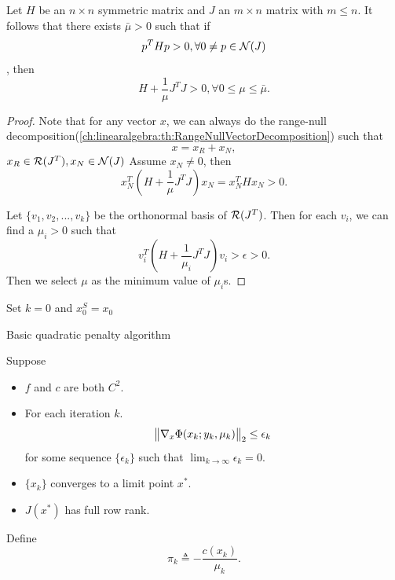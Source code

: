 \begin{refsection}
\begin{lemma}\label{ch:constrained-nonlinear-optimization:th:DebreuLemma}
Let $H$ be an $n\times n$ symmetric matrix and $J$ an $m\times n$ matrix with $m\leq n$. It follows that there exists $\bar{\mu} > 0$ such that if
 $$p^THp > 0, \forall 0\neq p \in \mathcal{N}(J)$$, then $$H+\frac{1}{\mu}J^TJ > 0, \forall 0\leq \mu \leq \bar{\mu}.$$
\end{lemma}
\begin{proof}
Note that for any vector $x$, we can always do the range-null decomposition(\autoref{ch:linearalgebra:th:RangeNullVectorDecomposition}) such that 
$$x = x_R + x_N,$$
$x_R \in \mathcal{R}(J^T), x_N\in \mathcal{N}(J)$
Assume $x_N\neq 0$, then 
$$x_N^T(H + \frac{1}{\mu}J^TJ)x_N = x_N^THx_N > 0.$$

Let $\{v_1,v_2,...,v_k\}$ be the orthonormal basis of $\mathcal{R}(J^T)$. Then for each $v_i$, we can find a $\mu_i > 0$ such that
$$v_i^T(H + \frac{1}{\mu_i}J^TJ)v_i > \epsilon > 0.$$
Then we select $\mu$ as the minimum value of $\mu_i$s.
\end{proof}

\begin{algorithm}[H]
	\SetAlgoLined
	Set $k = 0$ and $x_0^S = x_0$ \\
	\caption{Basic quadratic penalty algorithm}
\end{algorithm}

\begin{lemma}
	Suppose 
	\begin{itemize}
		\item $f$ and $c$ are both $C^2$.
		\item For each iteration $k$.
		$$\norm{\nabla_x \Phi(x_k;y_k,\mu_k)}_2 \leq \epsilon_k$$
		for some sequence $\{\epsilon_k\}$ such that $\lim_{k\to \infty} \epsilon_k = 0$.
		\item $\{x_k\}$ converges to a limit point $x^*$.
		\item $J(x^*)$ has full row rank.
	\end{itemize}
	Define
	$$\pi_k \triangleq - \frac{c(x_k)}{\mu_k}.$$
	

\end{lemma}
\end{refsection}
